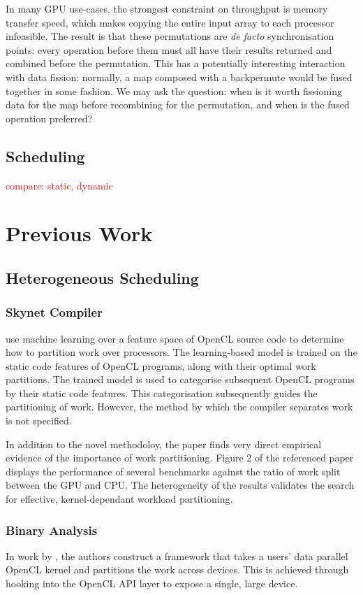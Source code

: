 \documentclass[a4paper,12pt]{article}
\newcommand{\red}[1]{\textcolor{red}{#1}}
\begin{document}
In many GPU use-cases, the strongest constraint on throughput is memory transfer speed, which makes copying the entire input array to each processor infeasible.
The result is that these permutations are \textit{de facto} synchronisation points: every operation before them must all have their results returned and combined before the permutation.
This has a potentially interesting interaction with data fission: normally, a map composed with a backpermute would be fused together in some fashion.
We may ask the question: when is it worth fissioning data for the map before recombining for the permutation, and when is the fused operation preferred?

\subsection{Scheduling}
\red{compare: static, dynamic}

\section{Previous Work}

\subsection{Heterogeneous Scheduling}

\subsubsection*{Skynet Compiler}
\citet*{grewe_static_????} use machine learning over a feature space of OpenCL source code to determine how to partition work over processors.
The learning-based model is trained on the static code features of OpenCL programs, along with their optimal work partitions.
The trained model is used to categorise subsequent OpenCL programs by their static code features.
This categorisation subsequently guides the partitioning of work.
However, the method by which the compiler separates work is not specified.

In addition to the novel methodoloy, the paper finds very direct empirical evidence of the importance of work partitioning.
Figure 2 of the referenced paper displays the performance of several benchmarks against the ratio of work split between the GPU and CPU.
The heterogeneity of the results validates the search for effective, kernel-dependant workload partitioning.

\subsubsection*{Binary Analysis}
In work by \citet*{lee_transparent_2013}, the authors construct a framework that takes a users' data parallel OpenCL kernel and partitions the work across devices.
This is achieved through hooking into the OpenCL API layer to expose a single, large device.
\end{document}
